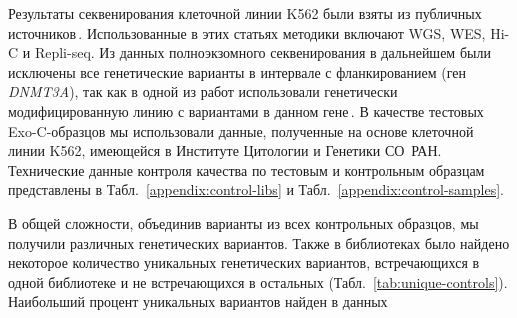 \documentclass[a4paper,14pt]{extarticle}
\newcommand{\genename}[1]{\textit{#1}}
\newcommand{\tableref}[1]{Табл.~\ref{#1}}
\begin{document}
Результаты секвенирования клеточной линии K562 были взяты из публичных источников\,\citep{Banaszak_2018,Belaghzal_2017,Dixon_2018,Moquin_2017,Rao_2014,Ray_2019,Wang_2020,Zhou_2019}.
Использованные в этих статьях методики включают WGS, WES, Hi-C и Repli-seq.
Из данных полноэкзомного секвенирования в дальнейшем были исключены все генетические варианты в интервале  с фланкированием  (ген \genename{DNMT3A}), так как в одной из работ использовали генетически модифицированную линию с вариантами в данном гене\,\citep{Banaszak_2018}.
В качестве тестовых Exo-C-образцов мы использовали данные, полученные на основе клеточной линии K562, имеющейся в Институте Цитологии и Генетики СО~РАН.
Технические данные контроля качества по тестовым и контрольным образцам представлены в \tableref{appendix:control-libs} и \tableref{appendix:control-samples}.

В общей сложности, объединив варианты из всех контрольных образцов, мы получили  различных генетических вариантов.
Также в библиотеках было найдено некоторое количество уникальных генетических вариантов, встречающихся в одной библиотеке и не встречающихся в остальных (\tableref{tab:unique-controls}).
Наибольший процент уникальных вариантов найден в данных \citeauthor{Banaszak_2018}
\end{document}
